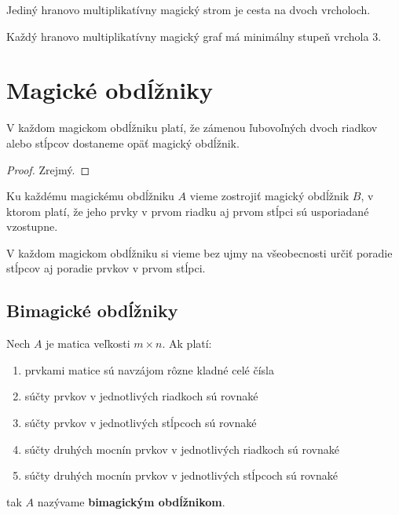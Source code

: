 \begin{consequence}
Jediný hranovo multiplikatívny magický strom je cesta na dvoch vrcholoch.
\end{consequence}

\begin{consequence} Každý hranovo multiplikatívny magický graf má minimálny stupeň vrchola $3$.
\end{consequence}

\section{Magické obdĺžniky}

\begin{theorem} V každom magickom obdĺžniku platí, že zámenou ľubovoľných dvoch riadkov alebo stĺpcov dostaneme opäť magický obdĺžnik.
\end{theorem}

\begin{proof}
Zrejmý.
\end{proof}

\begin{consequence} Ku každému magickému obdĺžniku $A$ vieme zostrojiť magický obdĺžnik $B$, v ktorom platí, že jeho prvky v prvom riadku aj prvom stĺpci sú usporiadané vzostupne.
\end{consequence}

\begin{consequence}
\label{rectangleorder}
V každom magickom obdĺžniku si vieme bez ujmy na všeobecnosti určiť poradie stĺpcov aj poradie prvkov v prvom stĺpci.
\end{consequence}

\subsection{Bimagické obdĺžniky}

\begin{definition} Nech $A$ je matica veľkosti $m \times n$. Ak platí:

\begin{enumerate}
\item prvkami matice sú navzájom rôzne kladné celé čísla
\item súčty prvkov v jednotlivých riadkoch sú rovnaké
\item súčty prvkov v jednotlivých stĺpcoch sú rovnaké
\item súčty druhých mocnín prvkov v jednotlivých riadkoch sú rovnaké
\item súčty druhých mocnín prvkov v jednotlivých stĺpcoch sú rovnaké
\end{enumerate}

tak $A$ nazývame \textbf{bimagickým obdĺžnikom}.
\end{definition}

